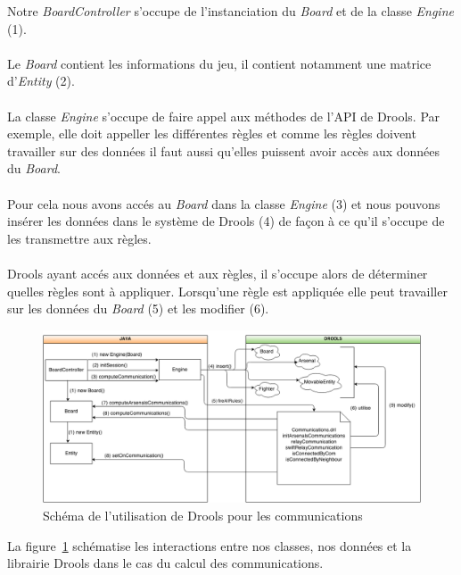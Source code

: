 			Notre {\itshape BoardController} s'occupe de l'instanciation du {\itshape Board} et de la classe {\itshape Engine} (1).
			\\ \\
			Le {\itshape Board} contient les informations du jeu, il contient notamment une matrice d'{\itshape Entity} (2).
			\\ \\
			La classe {\itshape Engine} s'occupe de faire appel aux méthodes de l'API de Drools. Par exemple, elle doit appeller les différentes règles et comme les règles doivent travailler sur des données il faut aussi qu'elles puissent avoir accès aux données du {\itshape Board}.
			\\ \\
			Pour cela nous avons accés au {\itshape Board} dans la classe {\itshape Engine} (3) et nous pouvons insérer les données dans le système de Drools (4) de façon à ce qu'il s'occupe de les transmettre aux règles.
			\\ \\
			Drools ayant accés aux données et aux règles, il s'occupe alors de déterminer quelles règles sont à appliquer. Lorsqu'une règle est appliquée elle peut travailler sur les données du {\itshape Board} (5) et les modifier (6). 

		

			\begin{figure}[!h]
			    \caption{Schéma de l'utilisation de Drools pour les communications}
			    \centerline{\includegraphics[scale=0.5]{images/architecture/drools_schema_use_communications.png}}
			    \label{fig:drools_communication}
			\end{figure}

			La figure~\ref{fig:drools_communication} schématise les interactions entre nos classes, nos données et la librairie Drools dans le cas du calcul des communications.

			

